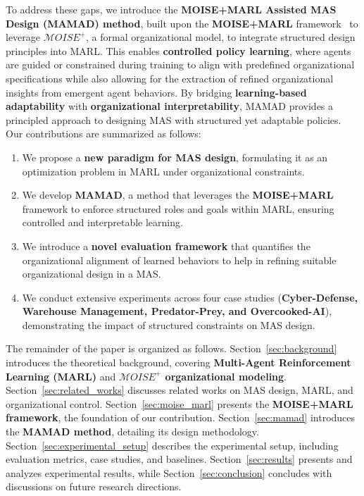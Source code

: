 \documentclass[pdflatex,sn-mathphys-num]{sn-jnl}%
\theoremstyle{thmstyleone}%
\theoremstyle{thmstyletwo}%
\theoremstyle{thmstylethree}%
\begin{document}
To address these gaps, we introduce the \textbf{MOISE+MARL Assisted MAS Design (MAMAD) method}, built upon the \textbf{MOISE+MARL} framework~\cite{soule2025moisemarl} to leverage \textbf{$\mathcal{M}OISE^+$}, a formal organizational model, to integrate structured design principles into MARL. This enables \textbf{controlled policy learning}, where agents are guided or constrained during training to align with predefined organizational specifications while also allowing for the extraction of refined organizational insights from emergent agent behaviors. By bridging \textbf{learning-based adaptability} with \textbf{organizational interpretability}, MAMAD provides a principled approach to designing MAS with structured yet adaptable policies. Our contributions are summarized as follows:

\begin{enumerate}
    \item We propose a \textbf{new paradigm for MAS design}, formulating it as an optimization problem in MARL under organizational constraints.
    \item We develop \textbf{MAMAD}, a method that leverages the \textbf{MOISE+MARL} framework to enforce structured roles and goals within MARL, ensuring controlled and interpretable learning.
    \item We introduce a \textbf{novel evaluation framework} that quantifies the organizational alignment of learned behaviors to help in refining suitable organizational design in a MAS.
    \item We conduct extensive experiments across four case studies (\textbf{Cyber-Defense, Warehouse Management, Predator-Prey, and Overcooked-AI}), demonstrating the impact of structured constraints on MAS design.
\end{enumerate}

The remainder of the paper is organized as follows. Section~\ref{sec:background} introduces the theoretical background, covering \textbf{Multi-Agent Reinforcement Learning (MARL)} and \textbf{$\mathcal{M}OISE^+$ organizational modeling}. Section~\ref{sec:related_works} discusses related works on MAS design, MARL, and organizational control. Section~\ref{sec:moise_marl} presents the \textbf{MOISE+MARL framework}, the foundation of our contribution. Section~\ref{sec:mamad} introduces the \textbf{MAMAD method}, detailing its design methodology. Section~\ref{sec:experimental_setup} describes the experimental setup, including evaluation metrics, case studies, and baselines. Section~\ref{sec:results} presents and analyzes experimental results, while Section~\ref{sec:conclusion} concludes with discussions on future research directions.
\end{document}
